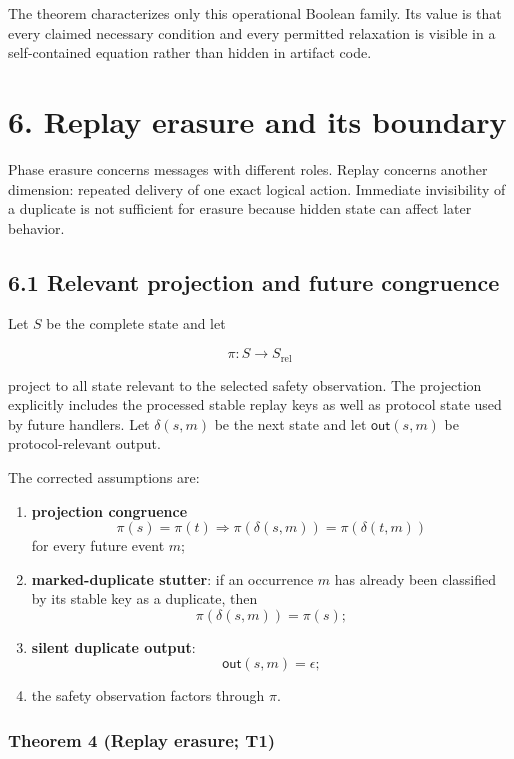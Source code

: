 \documentclass[10pt,a4paper]{article}
\newcommand{\tightlist}{\setlength{\itemsep}{0pt}\setlength{\parskip}{0pt}}
\begin{document}
The theorem characterizes only this operational Boolean family. Its
value is that every claimed necessary condition and every permitted
relaxation is visible in a self-contained equation rather than hidden in
artifact code.

\section{6. Replay erasure and its
boundary}\label{replay-erasure-and-its-boundary}

Phase erasure concerns messages with different roles. Replay concerns
another dimension: repeated delivery of one exact logical action.
Immediate invisibility of a duplicate is not sufficient for erasure
because hidden state can affect later behavior.

\subsection{6.1 Relevant projection and future
congruence}\label{relevant-projection-and-future-congruence}

Let \(S\) be the complete state and let

\[
\pi:S\rightarrow S_{\mathrm{rel}}
\]

project to all state relevant to the selected safety observation. The
projection explicitly includes the processed stable replay keys as well
as protocol state used by future handlers. Let \(\delta(s,m)\) be the
next state and let \(\mathsf{out}(s,m)\) be protocol-relevant output.

The corrected assumptions are:

\begin{enumerate}
\def\labelenumi{\arabic{enumi}.}
\tightlist
\item
  \textbf{projection congruence} \[
  \pi(s)=\pi(t)\Longrightarrow
  \pi(\delta(s,m))=\pi(\delta(t,m))
  \] for every future event \(m\);
\item
  \textbf{marked-duplicate stutter}: if an occurrence \(m\) has already
  been classified by its stable key as a duplicate, then \[
  \pi(\delta(s,m))=\pi(s);
  \]
\item
  \textbf{silent duplicate output}: \[
  \mathsf{out}(s,m)=\epsilon;
  \]
\item
  the safety observation factors through \(\pi\).
\end{enumerate}

\subsubsection{Theorem 4 (Replay erasure;
T1)}\label{theorem-4-replay-erasure-t1}
\end{document}
